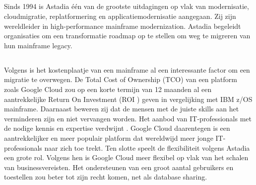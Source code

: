 \subsection{}
\label{sec:Wat is Astadia?}

Sinds 1994 is Astadia één van de grootste uitdagingen op vlak van modernisatie, cloudmigratie, replatformering en applicatiemodernisatie aangegaan. Zij zijn wereldleider in high-performance mainframe modernization. Astadia begeleidt organisaties om een transformatie roadmap op te stellen om weg te migreren van hun mainframe legacy. 

\subsection{}
\label{sec:Waarom zouden we onze mainframe legacy en databases migreren naar Google Cloud?}

Volgens \textcite{Astadia2021} is het kostenplaatje van een mainframe al een interessante factor om een migratie te overwegen. De Total Cost of Ownership (TCO) van een platform zoals Google Cloud zou op een korte termijn van 12 maanden al een aantrekkelijke Return On Investment (ROI ) geven in vergelijking met IBM z/OS mainframe. Daarnaast beweren zij dat de mensen met de juiste skills aan het verminderen zijn en niet vervangen worden. Het aanbod van IT-professionals met de nodige kennis en expertise verdwijnt \autocite{Astadia2021}. Google Cloud daarentegen is een aantrekkelijker en meer populair platform dat wereldwijd meer jonge IT-professionals naar zich toe trekt. Ten slotte speelt de flexibiliteit volgens Astadia een grote rol. Volgens hen is Google Cloud meer flexibel op vlak van het schalen van businessvereisten. Het ondersteunen van een groot aantal gebruikers en toestellen zou beter tot zijn recht komen, net als database sharing. 

